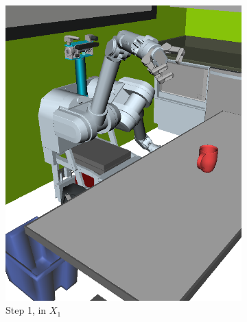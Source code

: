 \begin{figure}
\begin{widepage}
\begin{subfigure}[t]{0.185\linewidth}
\includegraphics[width=\columnwidth]{figs/testherb-b.png}
\caption{Step 1, in $X_1$}
\end{subfigure}
\begin{subfigure}[t]{0.185\linewidth}
\centering

\end{subfigure}
\end{widepage}
\end{figure}
